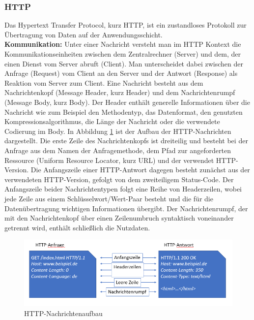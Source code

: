 \noindent
\subsubsection{HTTP}
Das Hypertext Transfer Protocol, kurz HTTP, ist ein zustandloses Protokoll zur Übertragung von Daten auf der Anwendungsschicht. \\

\noindent
{}
\textbf{Kommunikation:}
Unter einer Nachricht versteht man im HTTP Kontext die Kommunikationseinheiten zwischen dem Zentralrechner (Server) und dem, der einen Dienst vom Server abruft (Client). 
Man unterscheidet dabei zwischen der Anfrage (Request) vom Client an den Server und der Antwort (Response) als Reaktion vom Server zum Client. 
\newline
\noindent
Eine Nachricht besteht aus dem Nachrichtenkopf (Message Header, kurz Header) und dem Nachrichtenrumpf (Message Body, kurz Body). 
Der Header enthält generelle Informationen über die Nachricht wie zum Beispiel den Methodentyp, das Datenformat, den genutzten Kompressionsalgorithmus, die Länge der Nachricht oder die verwendete Codierung im Body. 
\newline
\noindent
In Abbildung \ref{fig:HTTPNachricht} ist der Aufbau der HTTP-Nachrichten dargestellt.
Die erste Zeile des Nachrichtenkopfs ist dreiteilig und besteht bei der Anfrage aus dem Namen der Anfragemethode, dem Pfad zur angeforderten Ressource (Uniform Resource Locator, kurz URL) und der verwendet HTTP-Version. Die Anfangszeile einer HTTP-Antwort dagegen besteht zunächst aus der verwendeten HTTP-Version, gefolgt von dem zweiteiligem Status-Code. 
Der Anfangszeile beider Nachrichtentypen folgt eine Reihe von Headerzeilen, wobei jede Zeile aus einem Schlüsselwort/Wert-Paar besteht und die für die Datenübertragung wichtigen Informationen übergibt. 
Der Nachrichtenrumpf, der mit den Nachrichtenkopf über einen Zeilenumbruch syntaktisch voneinander getrennt wird, enthält schließlich die Nutzdaten.
\newline

\begin{figure}[tbt]
\centering
\includegraphics[width=\textwidth]{images/netzwerkprotokolle_http.PNG}
\caption{HTTP-Nachrichtenaufbau}
\label{fig:HTTPNachricht}
\end{figure}

